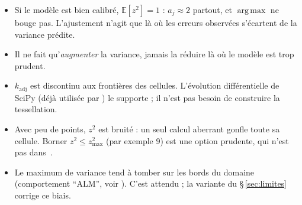\documentclass[10pt,a4paper]{article}
\theoremstyle{plain}
\DeclareMathOperator*{\argmax}{arg\,max}
\begin{document}
\begin{subtilite}
\begin{itemize}
  \item Si le modèle est bien calibré, $\mathbb{E}[z^2]=1$ : $a_j\approx2$ partout, et $\argmax$ ne bouge pas.
        L'ajustement n'agit que là où les erreurs observées s'écartent de la variance prédite.
  \item Il ne fait qu'\emph{augmenter} la variance, jamais la réduire là où le modèle est trop prudent.
  \item $k_{\mathrm{adj}}$ est discontinu aux frontières des cellules. L'évolution différentielle de SciPy
        (déjà utilisée par ) le supporte ; il n'est pas besoin de
        construire la tessellation.
  \item Avec peu de points, $z^2$ est bruité : un seul calcul aberrant gonfle toute sa cellule. Borner
        $z^2\le z^2_{\max}$ (par exemple 9) est une option prudente, qui n'est pas dans~\cite{LGC15}.
  \item Le maximum de variance tend à tomber sur les bords du domaine (comportement \enquote{ALM}, voir
        \cite[ch.~6]{Gra20}). C'est attendu ; la variante du §\,\ref{sec:limites} corrige ce biais.
\end{itemize}
\end{subtilite}

\end{document}
